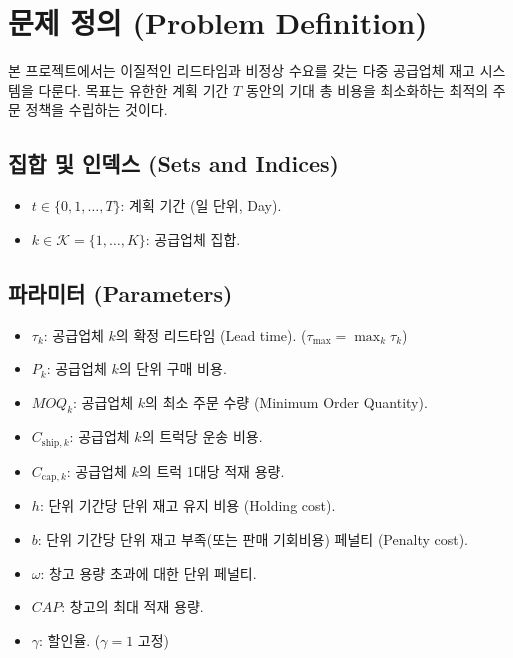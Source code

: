\documentclass[a4paper, 11pt]{article}
\begin{document}
\section{문제 정의 (Problem Definition)}

본 프로젝트에서는 이질적인 리드타임과 비정상 수요를 갖는 다중 공급업체 재고 시스템을 다룬다. 목표는 유한한 계획 기간 $T$ 동안의 기대 총 비용을 최소화하는 최적의 주문 정책을 수립하는 것이다.

\subsection{집합 및 인덱스 (Sets and Indices)}
\begin{itemize}
    \item $t \in \{0, 1, \dots, T\}$: 계획 기간 (일 단위, Day).
    \item $k \in \mathcal{K} = \{1, \dots, K\}$: 공급업체 집합.
\end{itemize}

\subsection{파라미터 (Parameters)}
\begin{itemize}
    \item $\tau_k$: 공급업체 $k$의 확정 리드타임 (Lead time). ($\tau_{\max} = \max_{k} \tau_k$)
    \item $P_k$: 공급업체 $k$의 단위 구매 비용.
    \item $MOQ_k$: 공급업체 $k$의 최소 주문 수량 (Minimum Order Quantity).
    \item $C_{\text{ship}, k}$: 공급업체 $k$의 트럭당 운송 비용.
    \item $C_{\text{cap}, k}$: 공급업체 $k$의 트럭 1대당 적재 용량.
    \item $h$: 단위 기간당 단위 재고 유지 비용 (Holding cost).
    \item $b$: 단위 기간당 단위 재고 부족(또는 판매 기회비용) 페널티 (Penalty cost).
    \item $\omega$: 창고 용량 초과에 대한 단위 페널티.
    \item $CAP$: 창고의 최대 적재 용량.
    \item $\gamma$: 할인율. ($\gamma = 1$ 고정)
\end{itemize}
\end{document}
